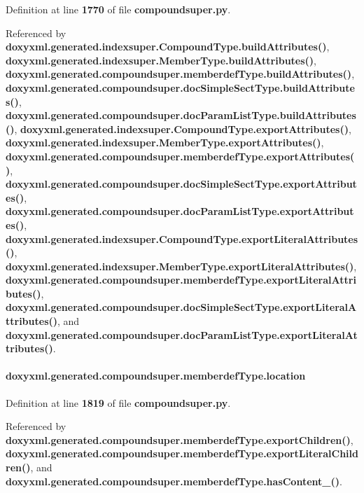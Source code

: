 Definition at line {\bf 1770} of file {\bf compoundsuper.\+py}.



Referenced by {\bf doxyxml.\+generated.\+indexsuper.\+Compound\+Type.\+build\+Attributes()}, {\bf doxyxml.\+generated.\+indexsuper.\+Member\+Type.\+build\+Attributes()}, {\bf doxyxml.\+generated.\+compoundsuper.\+memberdef\+Type.\+build\+Attributes()}, {\bf doxyxml.\+generated.\+compoundsuper.\+doc\+Simple\+Sect\+Type.\+build\+Attributes()}, {\bf doxyxml.\+generated.\+compoundsuper.\+doc\+Param\+List\+Type.\+build\+Attributes()}, {\bf doxyxml.\+generated.\+indexsuper.\+Compound\+Type.\+export\+Attributes()}, {\bf doxyxml.\+generated.\+indexsuper.\+Member\+Type.\+export\+Attributes()}, {\bf doxyxml.\+generated.\+compoundsuper.\+memberdef\+Type.\+export\+Attributes()}, {\bf doxyxml.\+generated.\+compoundsuper.\+doc\+Simple\+Sect\+Type.\+export\+Attributes()}, {\bf doxyxml.\+generated.\+compoundsuper.\+doc\+Param\+List\+Type.\+export\+Attributes()}, {\bf doxyxml.\+generated.\+indexsuper.\+Compound\+Type.\+export\+Literal\+Attributes()}, {\bf doxyxml.\+generated.\+indexsuper.\+Member\+Type.\+export\+Literal\+Attributes()}, {\bf doxyxml.\+generated.\+compoundsuper.\+memberdef\+Type.\+export\+Literal\+Attributes()}, {\bf doxyxml.\+generated.\+compoundsuper.\+doc\+Simple\+Sect\+Type.\+export\+Literal\+Attributes()}, and {\bf doxyxml.\+generated.\+compoundsuper.\+doc\+Param\+List\+Type.\+export\+Literal\+Attributes()}.

\paragraph[{location}]{\setlength{\rightskip}{0pt plus 5cm}doxyxml.\+generated.\+compoundsuper.\+memberdef\+Type.\+location}\label{classdoxyxml_1_1generated_1_1compoundsuper_1_1memberdefType_a39e7c61e7e10652dfaaea03d31f3d397}


Definition at line {\bf 1819} of file {\bf compoundsuper.\+py}.



Referenced by {\bf doxyxml.\+generated.\+compoundsuper.\+memberdef\+Type.\+export\+Children()}, {\bf doxyxml.\+generated.\+compoundsuper.\+memberdef\+Type.\+export\+Literal\+Children()}, and {\bf doxyxml.\+generated.\+compoundsuper.\+memberdef\+Type.\+has\+Content\+\_\+()}.

